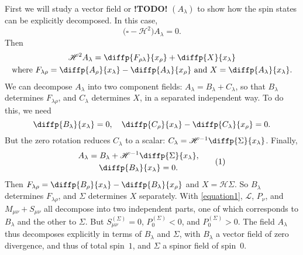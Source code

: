 \documentclass{article}
\newcommand{\HH}{\mathscr{H}}
\newcommand{\LL}{\mathscr{L}}
\newcommand{\todo}{\textbf{ !TODO! }}
\newcommand{\oldpage}[1]{\marginpar{\footnotesize$\Big\vert$ \textit{p.~#1}}}
\begin{document}
\oldpage{13-03}
First we will study a vector field or \todo $(A_\lambda)$ to show how the spin states can be explicitly decomposed.
In this case,
\[
  \Big(\square-\HH^2\Big)A_\lambda = 0.
\]
Then
\begin{gather*}
  \HH^2 A_\lambda = \diffp{{F_{\rho\lambda}}}{{x_\rho}} + \diffp{X}{{x_\lambda}}
\\\mbox{where $F_{\lambda\rho} = \diffp{{A_\rho}}{{x_\lambda}} - \diffp{{A_\lambda}}{{x_\rho}}$ and $X = \diffp{{A_\lambda}}{{x_\lambda}}$.}
\end{gather*}
We can decompose $A_\lambda$ into two component fields: $A_\lambda=B_\lambda+C_\lambda$, so that $B_\lambda$ determines $F_{\lambda\rho}$, and $C_\lambda$ determines $X$, in a separated independent way.
To do this, we need
\[
  \diffp{{B_\lambda}}{{x_\lambda}} = 0,
  \quad
  \diffp{{C_\rho}}{{x_\lambda}} - \diffp{{C_\lambda}}{{x_\rho}} = 0.
\]
But the zero rotation reduces $C_\lambda$ to a scalar: $C_\lambda=\HH^{-1}\diffp{\Sigma}{{x_\lambda}}$.
Finally,
\[
\label{equation1}
  \begin{gathered}
    A_\lambda = B_\lambda + \HH^{-1}\diffp{\Sigma}{{x_\lambda}},
    \\\diffp{{B_\lambda}}{{x_\lambda}} = 0.
  \end{gathered}
  \tag{1}
\]
Then $F_{\lambda\rho}=\diffp{{B_\rho}}{{x_\lambda}}-\diffp{{B_\lambda}}{{x_\rho}}$ and $X=\HH\Sigma$.
So $B_\lambda$ determines $F_{\lambda\rho}$, and $\Sigma$ determines $X$ separately.
With \cref{equation1}, $\LL$, $P_\nu$, and $M_{\mu\nu}+S_{\mu\nu}$ all decompose into two independent parts, one of which corresponds to $B_\lambda$ and the other to $\Sigma$.
But $S_{\mu\nu}^{(\Sigma)}=0$, $P_0^{(\Sigma)}<0$, and $P_0^{(\Sigma)}>0$.
The field $A_\lambda$ thus decomposes explicitly in terms of $B_\lambda$ and $\Sigma$, with $B_\lambda$ a vector field of zero divergence, and thus of total spin~$1$, and $\Sigma$ a spinor field of spin~$0$.

\medskip\hrulefill\bigskip
\end{document}
